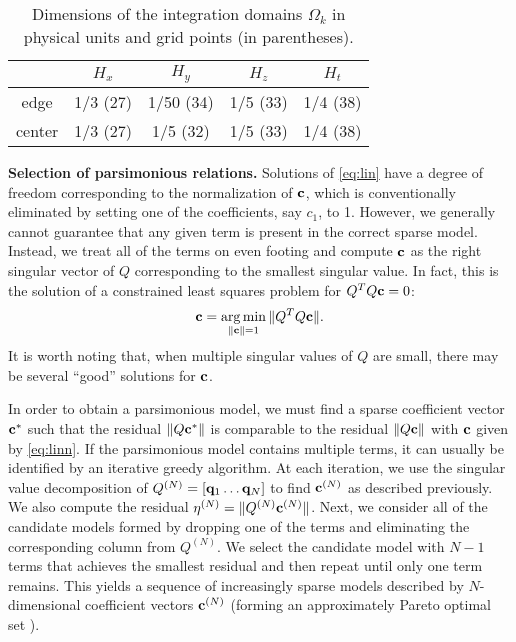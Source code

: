 \documentclass[9pt,twocolumn,twoside,lineno]{pnas-new}
\DeclareMathOperator*{\argmin}{arg\,min}
\begin{document}
\begin{table}
\centering
\begin{tabular}{*{5}{c}}
 & $H_x$ & $H_y$ & $H_z$ & $H_t$ \\ \hline
edge & 1/3 (27) & 1/50 (34) & 1/5 (33) & 1/4 (38) \\ 
center & 1/3 (27) & 1/5 (32) & 1/5 (33) & 1/4 (38) \\ \hline
\end{tabular}
\caption{Dimensions of the integration domains $\Omega_k$ in physical units and grid points (in parentheses).}
\label{tab:domain}
\end{table}

{\bf Selection of parsimonious relations.} Solutions of \eqref{eq:lin} have a degree of freedom corresponding to the normalization of ${\bf c}$, which is conventionally eliminated by setting one of the coefficients, say $c_1$, to 1. However, we generally cannot guarantee that any given term is present in the correct sparse model. Instead, we treat all of the terms on even footing and compute ${\bf c}$ as the right singular vector of $Q$ corresponding to the smallest singular value.
In fact, this is the solution of a constrained least squares problem for $Q^TQ{\bf c}=0$:
\begin{equation}
{\bf c}=\argmin_{\|{\bf c}\|=1}\|Q^TQ{\bf c}\|.
\label{eq:linn}
\end{equation}
It is worth noting that, when multiple singular values of $Q$ are small, there may be several ``good'' solutions for ${\bf c}$. 

In order to obtain a parsimonious model, we must find a sparse coefficient vector ${\bf c}^*$ such that the residual $\|Q{\bf c}^*\|$ is comparable to the residual $\|Q{\bf c}\|$ with ${\bf c}$ given by \eqref{eq:linn}. If the parsimonious model contains multiple terms, it can usually be identified by an iterative greedy algorithm. At each iteration, we use the singular value decomposition of $Q^{(N)} = [{\bf q}_1 \dots {\bf q}_N]$ to find ${\bf c}^{(N)}$ as described previously. We also compute the residual $\eta^{(N)} = \|Q^{(N)} {\bf c}^{(N)}\|$. Next, we consider all of the candidate models formed by dropping one of the terms and eliminating the corresponding column from $Q^{(N)}$. We select the candidate model with $N-1$ terms that achieves the smallest residual and then repeat until only one term remains. This yields a sequence of increasingly sparse models described by $N$-dimensional coefficient vectors ${\bf c}^{(N)}$ (forming an approximately Pareto optimal set \cite{miettinen2012}).
\end{document}
